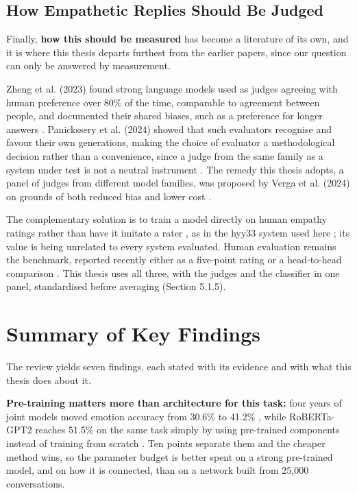 \subsection{How Empathetic Replies Should Be Judged}
\label{sec:2.2.8}

Finally, \textbf{how this should be measured} has become a literature of its own, and it is where this thesis departs furthest from the earlier papers, since our question can only be answered by measurement.

Zheng et al. (2023) found strong language models used as judges agreeing with human preference over 80\% of the time, comparable to agreement between people, and documented their shared biases, such as a preference for longer answers \cite{zheng2023judge}. Panickssery et al. (2024) showed that such evaluators recognise and favour their own generations, making the choice of evaluator a methodological decision rather than a convenience, since a judge from the same family as a system under test is not a neutral instrument \cite{panickssery2024}. The remedy this thesis adopts, a panel of judges from different model families, was proposed by Verga et al. (2024) on grounds of both reduced bias and lower cost \cite{verga2024}.

The complementary solution is to train a model directly on human empathy ratings rather than have it imitate a rater \cite{giorgi2024wassa}, as in the hyy33 system used here \cite{yang2024hyy33}; its value is being unrelated to every system evaluated. Human evaluation remains the benchmark, reported recently either as a five-point rating \cite{qian2023llm} or a head-to-head comparison \cite{cao2025tooled}. This thesis uses all three, with the judges and the classifier in one panel, standardised before averaging (Section 5.1.5).

\section{Summary of Key Findings}
\label{sec:2.3}

The review yields seven findings, each stated with its evidence and with what this thesis does about it.

\textbf{Pre-training matters more than architecture for this task:} four years of joint models moved emotion accuracy from 30.6\% to 41.2\% \cite{lin2019moel,majumder2020mime,li2020empdg,li2022kemp,sabour2022cem,zhou2023case,yang2023escm}, while RoBERTa-GPT2 reaches 51.5\% on the same task simply by using pre-trained components instead of training from scratch \cite{liu2021robertagpt2}. Ten points separate them and the cheaper method wins, so the parameter budget is better spent on a strong pre-trained model, and on how it is connected, than on a network built from 25,000 conversations.

